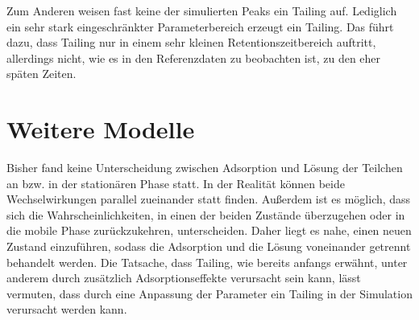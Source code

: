 Zum Anderen weisen fast keine der simulierten Peaks ein Tailing auf. Lediglich ein sehr stark eingeschränkter Parameterbereich erzeugt ein Tailing. Das führt dazu, dass Tailing nur in einem sehr kleinen Retentionszeitbereich auftritt, allerdings nicht, wie es in den Referenzdaten zu beobachten ist, zu den eher späten Zeiten.


\section{Weitere Modelle}

Bisher fand keine Unterscheidung zwischen Adsorption und Lösung der Teilchen an bzw. in der stationären Phase statt. In der Realität können beide Wechselwirkungen parallel zueinander statt finden. Außerdem ist es möglich, dass sich die Wahrscheinlichkeiten, in einen der beiden Zustände überzugehen oder in die mobile Phase zurückzukehren, unterscheiden. Daher liegt es nahe, einen neuen Zustand einzuführen, sodass die Adsorption und die Lösung voneinander getrennt behandelt werden. Die Tatsache, dass Tailing, wie bereits anfangs erwähnt, unter anderem durch zusätzlich Adsorptionseffekte verursacht sein kann, lässt vermuten, dass durch eine Anpassung der Parameter ein Tailing in der Simulation verursacht werden kann. 
 
